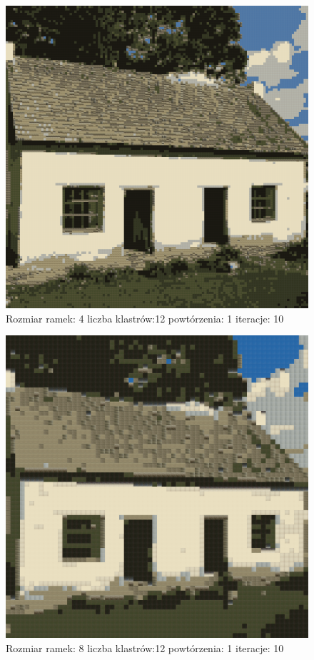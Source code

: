 \documentclass{classrep}
\begin{document}
{{{{                    \begin{figure}[!htbp]
                        \centering
                        \includegraphics[width=\textwidth,width=90mm]{obrazy/house_R4_K12_P1_It10.png}
                        \caption{Rozmiar ramek: 4 liczba klastrów:12 powtórzenia: 1 iteracje: 10 }
                    \end{figure}

                    \begin{figure}[!htbp]
                        \centering
                        \includegraphics[width=\textwidth,width=90mm]{obrazy/house_R8_K12_P1_It10.png}
                        \caption{Rozmiar ramek: 8 liczba klastrów:12 powtórzenia: 1 iteracje: 10 }
                    \end{figure}

}}}}
\end{document}
